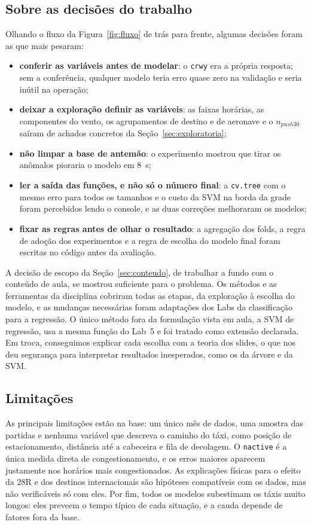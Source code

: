 \documentclass[12pt,a4paper]{article}
\begin{document}
\subsection{Sobre as decisões do trabalho}

Olhando o fluxo da Figura~\ref{fig:fluxo} de trás para frente, algumas decisões foram as que mais pesaram:
\begin{itemize}
  \item \textbf{conferir as variáveis antes de modelar}: o \texttt{crwy} era a própria resposta; sem a conferência, qualquer modelo teria erro quase zero na validação e seria inútil na operação;
  \item \textbf{deixar a exploração definir as variáveis}: as faixas horárias, as componentes do vento, os agrupamentos de destino e de aeronave e o $n_{push30}$ saíram de achados concretos da Seção~\ref{sec:exploratoria};
  \item \textbf{não limpar a base de antemão}: o experimento mostrou que tirar os anômalos pioraria o modelo em 8~s;
  \item \textbf{ler a saída das funções, e não só o número final}: a \texttt{cv.tree} com o mesmo erro para todos os tamanhos e o custo da SVM na borda da grade foram percebidos lendo o console, e as duas correções melhoraram os modelos;
  \item \textbf{fixar as regras antes de olhar o resultado}: a agregação dos folds, a regra de adoção dos experimentos e a regra de escolha do modelo final foram escritas no código antes da avaliação.
\end{itemize}

A decisão de escopo da Seção~\ref{sec:conteudo}, de trabalhar a fundo com o conteúdo de aula, se mostrou suficiente para o problema. Os métodos e as ferramentas da disciplina cobriram todas as etapas, da exploração à escolha do modelo, e as mudanças necessárias foram adaptações dos Labs da classificação para a regressão. O único método fora da formulação vista em aula, a SVM de regressão, usa a mesma função do Lab~5 e foi tratado como extensão declarada. Em troca, conseguimos explicar cada escolha com a teoria dos slides, o que nos deu segurança para interpretar resultados inesperados, como os da árvore e da SVM.

\subsection{Limitações}

As principais limitações estão na base: um único mês de dados, uma amostra das partidas e nenhuma variável que descreva o caminho do táxi, como posição de estacionamento, distância até a cabeceira e fila de decolagem. O \texttt{nactive} é a única medida direta de congestionamento, e os erros maiores aparecem justamente nos horários mais congestionados. As explicações físicas para o efeito da 28R e dos destinos internacionais são hipóteses compatíveis com os dados, mas não verificáveis só com eles. Por fim, todos os modelos subestimam os táxis muito longos: eles preveem o tempo típico de cada situação, e a cauda depende de fatores fora da base.
\end{document}
